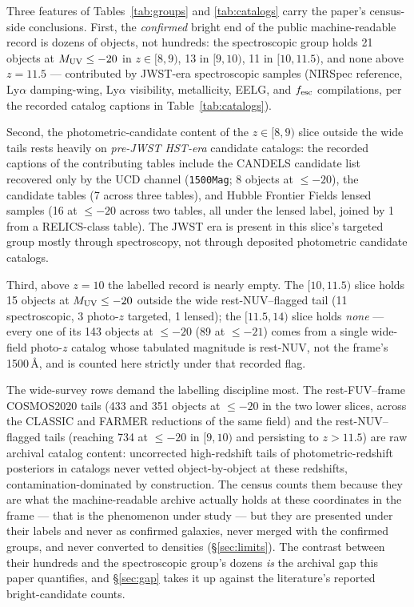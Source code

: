 \documentclass[twocolumn]{aastex702}
\begin{document}
Three features of Tables~\ref{tab:groups} and \ref{tab:catalogs} carry the paper's
census-side conclusions. First, the \emph{confirmed} bright end of the public
machine-readable record is dozens of objects, not hundreds: the spectroscopic group
holds 21 objects at $M_{\rm UV}\le-20$ in $z\in[8,9)$, 13 in $[9,10)$, 11 in
$[10,11.5)$, and none above $z=11.5$ --- contributed by JWST-era spectroscopic samples
(NIRSpec reference, Ly$\alpha$ damping-wing, Ly$\alpha$ visibility, metallicity, EELG,
and $f_{\rm esc}$ compilations, per the recorded catalog captions in
Table~\ref{tab:catalogs}).

Second, the photometric-candidate content of the $z\in[8,9)$ slice outside the wide
tails rests heavily on \emph{pre-JWST HST-era} candidate catalogs: the recorded captions
of the contributing tables include the CANDELS candidate list recovered only by the UCD
channel (\texttt{1500Mag}; 8 objects at $\le-20$), the \citet{mclure13} candidate
tables (7 across three tables), and Hubble Frontier Fields lensed samples (16 at
$\le-20$ across two tables, all under the lensed label, joined by 1 from a RELICS-class
table). The JWST era is present in this slice's targeted group mostly through
spectroscopy, not through deposited photometric candidate catalogs.

Third, above $z=10$ the labelled record is nearly empty. The $[10,11.5)$ slice holds 15
objects at $M_{\rm UV}\le-20$ outside the wide rest-NUV--flagged tail (11
spectroscopic, 3 photo-$z$ targeted, 1 lensed); the $[11.5,14)$ slice holds
\emph{none} --- every one of its 143 objects at $\le-20$ (89 at $\le-21$) comes from a
single wide-field photo-$z$ catalog whose tabulated magnitude is rest-NUV, not the
frame's 1500\,\AA, and is counted here strictly under that recorded flag.

The wide-survey rows demand the labelling discipline most. The rest-FUV--frame
COSMOS2020 tails (433 and 351 objects at $\le-20$ in the two lower slices, across the
CLASSIC and FARMER reductions of the same field) and the rest-NUV--flagged tails
(reaching 734 at $\le-20$ in $[9,10)$ and persisting to $z>11.5$) are raw archival
catalog content: uncorrected high-redshift tails of photometric-redshift posteriors in
catalogs never vetted object-by-object at these redshifts, contamination-dominated by
construction. The census counts them because they are what the machine-readable archive
actually holds at these coordinates in the frame --- that is the phenomenon under
study --- but they are presented under their labels and never as confirmed galaxies,
never merged with the confirmed groups, and never converted to densities
(\S\ref{sec:limits}). The contrast between their hundreds and the spectroscopic
group's dozens \emph{is} the archival gap this paper quantifies, and \S\ref{sec:gap}
takes it up against the literature's reported bright-candidate counts.
\end{document}
